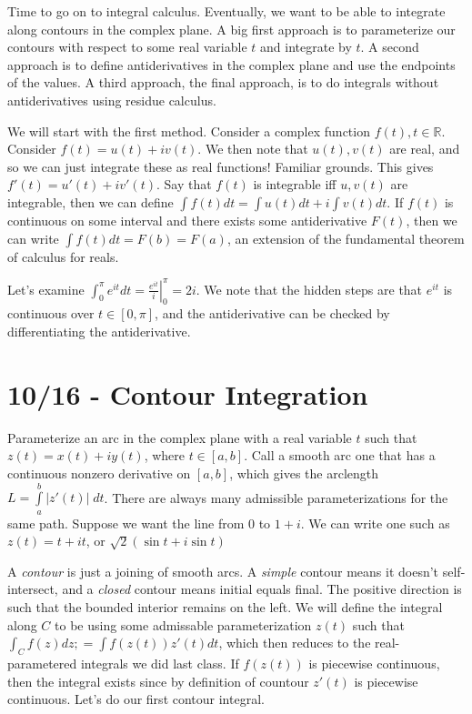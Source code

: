 \documentclass[10pt]{report}
\begin{document}
Time to go on to integral calculus. Eventually, we want to be able to integrate along contours in the complex plane. A big first approach is to parameterize our contours with respect to some real variable $t$ and integrate by $t$. A second approach is to define antiderivatives in the complex plane and use the endpoints of the values. A third approach, the final approach, is to do integrals without antiderivatives using residue calculus.

We will start with the first method. Consider a complex function $f(t), t \in \mathbb{R}$. Consider $f(t) = u(t) + iv(t)$. We then note that $u(t),v(t)$ are real, and so we can just integrate these as real functions! Familiar grounds. This gives $f'(t) = u'(t) + iv'(t)$. Say that $f(t)$ is integrable iff $u,v(t)$ are integrable, then we can define $\int f(t) dt = \int u(t) dt + i\int v(t) dt$. If $f(t)$ is continuous on some interval and there exists some antiderivative $F(t)$, then we can write $\int f(t) dt = F(b) = F(a)$, an extension of the fundamental theorem of calculus for reals. 

Let's examine $\int_0^\pi e^{it} dt = \left.\frac{e^{it}}{i}\right|_0^\pi = 2i$. We note that the hidden steps are that $e^{it}$ is continuous over $t\in[0,\pi]$, and the antiderivative can be checked by differentiating the antiderivative.
\chapter{10/16 - Contour Integration}

Parameterize an arc in the complex plane with a real variable $t$ such that $z(t) = x(t) + iy(t)$, where $t \in \left[ a,b \right]$. Call a smooth arc one that has a continuous nonzero derivative on $\left[ a,b \right]$, which gives the arclength $L = \displaystyle\int\limits_{a}^{b}|z'(t)|\;dt$. There are always many admissible parameterizations for the same path. Suppose we want the line from $0$ to $1+i$. We can write one such as $z(t) = t+it$, or $\sqrt{2}\left( \sin t + i \sin t \right)$

A \emph{contour} is just a joining of smooth arcs. A \emph{simple} contour means it doesn't self-intersect, and a \emph{closed} contour means initial equals final. The positive direction is such that the bounded interior remains on the left. We will define the integral along $C$ to be using some admissable parameterization $z(t)$ such that $\int_C f(z) dz; = \int f(z(t)) z'(t) dt$, which then reduces to the real-parametered integrals we did last class. If $f(z(t))$ is piecewise continuous, then the integral exists since by definition of countour $z'(t)$ is piecewise continuous. Let's do our first contour integral.
\end{document}

